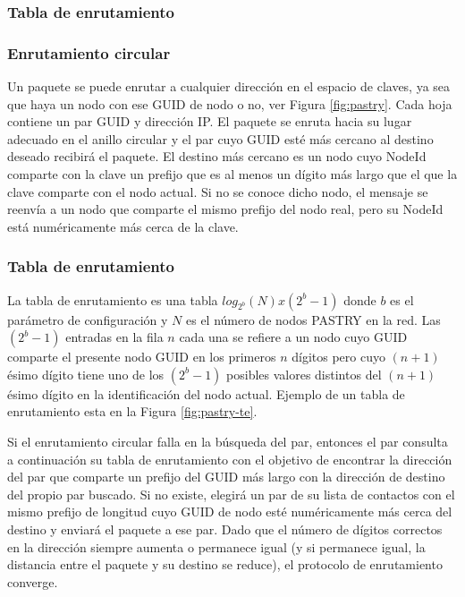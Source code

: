  
 \subsubsection{Tabla de enrutamiento}
 

 
 \subsubsection{Enrutamiento circular}
  
 Un paquete se puede enrutar a cualquier dirección en el espacio de claves, ya sea que haya un nodo con ese GUID de nodo o no, ver Figura \ref{fig:pastry}. Cada hoja contiene un par GUID y direcci\'on IP. 
  El paquete se enruta hacia su lugar adecuado en el anillo circular y el par cuyo GUID esté más cercano al destino deseado recibirá el paquete. El destino m\'as cercano es  un  nodo cuyo NodeId comparte con la clave un prefijo que es al menos un dígito más largo que el que la clave comparte con el nodo actual. 
   Si no se conoce dicho nodo, el mensaje se reenvía a un nodo que comparte el mismo prefijo del nodo real, pero su NodeId está numéricamente más cerca de la clave.
 
 
 \subsubsection{Tabla de enrutamiento  }
  La tabla de enrutamiento es una tabla $log_{2^{b}}(N) x (2^{b} - 1)$  donde $b$ es el parámetro de configuración y $N$ es el número de nodos PASTRY en la red.
 Las  $(2^{b} - 1)$ entradas en la fila $n$ cada una se refiere a un nodo cuyo GUID comparte el presente nodo GUID en los primeros $n$ dígitos  pero cuyo $(n + 1)$ésimo dígito tiene uno de los $(2^{b} - 1)$ posibles  valores distintos del $(n + 1)$ésimo dígito en la identificación del nodo actual. Ejemplo de un tabla de enrutamiento esta en la  Figura \ref{fig:pastry-te}. 
 
  Si el enrutamiento circular  falla en la b\'usqueda del par, entonces el par consulta a continuación su tabla de enrutamiento con el objetivo de encontrar la dirección del par que comparte un prefijo del GUID  más largo con la dirección de destino del propio par buscado. Si no existe, elegirá un par de su lista de contactos con el mismo prefijo de longitud cuyo GUID de nodo esté numéricamente más cerca del destino y enviará el paquete a ese par. Dado que el número de dígitos correctos en la dirección siempre aumenta o permanece igual (y si permanece igual, la distancia entre el paquete y su destino se reduce), el protocolo de enrutamiento converge.
  

